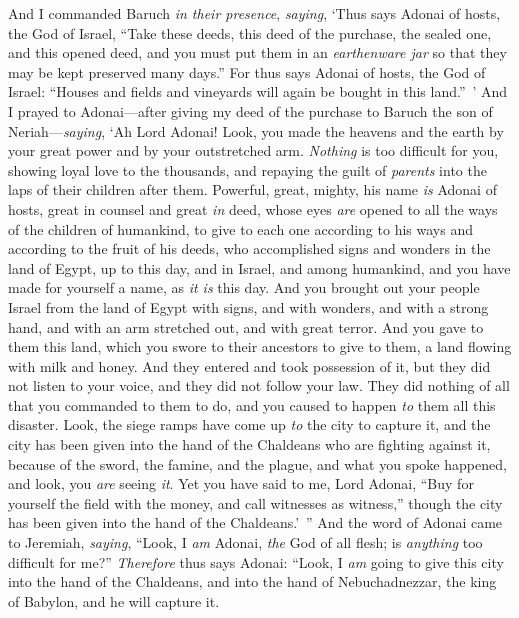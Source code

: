\begin{biblechapter}
\verse And I commanded Baruch \textit{in their presence}, \textit{saying},
\verse ‘Thus says Adonai of hosts, the God of Israel, “Take these deeds, this deed of the purchase, the sealed one, and this opened deed, and you must put them in an \textit{earthenware jar} so that they may be kept preserved many days.”
\verse For thus says Adonai of hosts, the God of Israel: “Houses and fields and vineyards will again be bought in this land.” ’
\verse And I prayed to Adonai—after giving my deed of the purchase to Baruch the son of Neriah—\textit{saying},
\verse ‘Ah Lord Adonai! Look, you made the heavens and the earth by your great power and by your outstretched arm. \textit{Nothing} is too difficult for you,
\verse showing loyal love to the thousands, and repaying the guilt of \textit{parents} into the laps of their children after them. Powerful, great, mighty, his name \textit{is} Adonai of hosts,
\verse great in counsel and great \textit{in} deed, whose eyes \textit{are} opened to all the ways of the children of humankind, to give to each one according to his ways and according to the fruit of his deeds,
\verse who accomplished signs and wonders in the land of Egypt, up to this day, and in Israel, and among humankind, and you have made for yourself a name, as \textit{it is} this day.
\verse And you brought out your people Israel from the land of Egypt with signs, and with wonders, and with a strong hand, and with an arm stretched out, and with great terror.
\verse And you gave to them this land, which you swore to their ancestors to give to them, a land flowing with milk and honey.
\verse And they entered and took possession of it, but they did not listen to your voice, and they did not follow your law. They did nothing of all that you commanded to them to do, and you caused to happen \textit{to} them all this disaster.
\verse Look, the siege ramps have come up \textit{to} the city to capture it, and the city has been given into the hand of the Chaldeans who are fighting against it, because of the sword, the famine, and the plague, and what you spoke happened, and look, you \textit{are} seeing \textit{it}.
\verse Yet you have said to me, Lord Adonai, “Buy for yourself the field with the money, and call witnesses as witness,” though the city has been given into the hand of the Chaldeans.’ ”
\verse And the word of Adonai came to Jeremiah, \textit{saying},
\verse “Look, I \textit{am} Adonai, \textit{the} God of all flesh; is \textit{anything} too difficult for me?”
\verse \textit{Therefore} thus says Adonai: “Look, I \textit{am} going to give this city into the hand of the Chaldeans, and into the hand of Nebuchadnezzar, the king of Babylon, and he will capture it.

\end{biblechapter}

